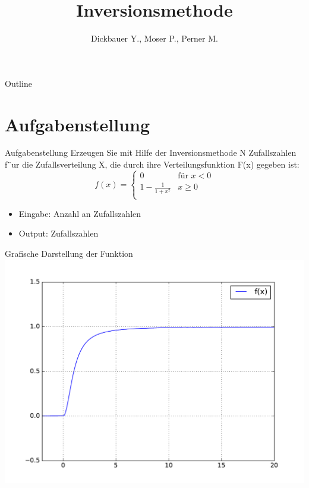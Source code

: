 

\title[BSP16 - Inversionsmethode]{Inversionsmethode}
\author{Dickbauer Y., Moser P., Perner M.}



\begin{frame}
  \titlepage
\end{frame}

\begin{frame}{Outline}
  \tableofcontents
\end{frame}

\section{Aufgabenstellung}
\begin{frame}{Aufgabenstellung}
Erzeugen Sie mit Hilfe der Inversionsmethode N Zufallszahlen f¨ur die Zufallsverteilung
X, die durch ihre Verteilungsfunktion F(x) gegeben ist:
\begin{equation}
   f(x) =
   \begin{cases}
     0 & \text{für } x < 0 \\
     1 - \frac{1}{1+x^2} & x \geq 0 \\
   \end{cases}
\end{equation}
\begin{itemize}
  \item Eingabe: Anzahl an Zufallszahlen
  \item Output: Zufallszahlen
\end{itemize}

\end{frame}

\begin{frame}{Grafische Darstellung der Funktion}
	\centering
  	\includegraphics[scale=0.5]{BSP16_plot_function.pdf}
\end{frame} 


